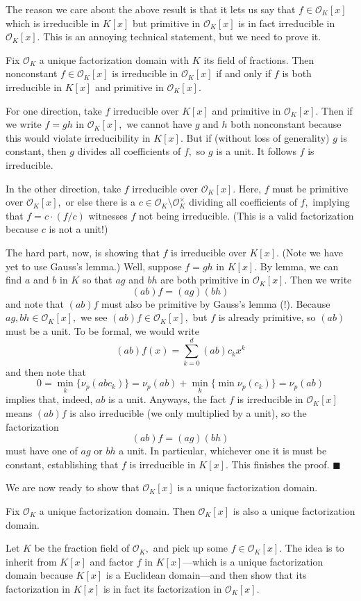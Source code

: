 The reason we care about the above result is that it lets us say that $f\in \mathcal O_K[x]$ which is irreducible in $K[x]$ but primitive in $\mathcal O_K[x]$ is in fact irreducible in $\mathcal O_K[x].$ This is an annoying technical statement, but we need to prove it.
\begin{lemma}
    Fix $\mathcal O_K$ a unique factorization domain with $K$ its field of fractions. Then nonconstant $f\in\mathcal O_K[x]$ is irreducible in $\mathcal O_K[x]$ if and only if $f$ is both irreducible in $K[x]$ and primitive in $\mathcal O_K[x].$
\end{lemma}
For one direction, take $f$ irreducible over $K[x]$ and primitive in $\mathcal O_K[x].$ Then if we write $f=gh$ in $\mathcal O_K[x],$ we cannot have $g$ and $h$ both nonconstant because this would violate irreducibility in $K[x].$ But if (without loss of generality) $g$ is constant, then $g$ divides all coefficients of $f,$ so $g$ is a unit. It follows $f$ is irreducible.

In the other direction, take $f$ irreducible over $\mathcal O_K[x].$ Here, $f$ must be primitive over $\mathcal O_K[x],$ or else there is a $c\in\mathcal O_K\setminus\mathcal O_K^\times$ dividing all coefficients of $f,$ implying that $f=c\cdot(f/c)$ witnesses $f$ not being irreducible. (This is a valid factorization because $c$ is not a unit!)

The hard part, now, is showing that $f$ is irreducible over $K[x].$ (Note we have yet to use Gauss's lemma.) Well, suppose $f=gh$ in $K[x].$ By lemma, we can find $a$ and $b$ in $K$ so that $ag$ and $bh$ are both primitive in $\mathcal O_K[x].$ Then we write
\[(ab)f=(ag)(bh)\]
and note that $(ab)f$ must also be primitive by Gauss's lemma (!). Because $ag,bh\in\mathcal O_K[x],$ we see $(ab)f\in\mathcal O_K[x],$ but $f$ is already primitive, so $(ab)$ must be a unit. To be formal, we would write
\[(ab)f(x)=\sum_{k=0}^d(ab)c_kx^k\]
and then note that
\[0=\min_k\{\nu_p(abc_k)\}=\nu_p(ab)+\min_k\{\min\nu_p(c_k)\}=\nu_p(ab)\]
implies that, indeed, $ab$ is a unit. Anyways, the fact $f$ is irreducible in $\mathcal O_K[x]$ means $(ab)f$ is also irreducible (we only multiplied by a unit), so the factorization
\[(ab)f=(ag)(bh)\]
must have one of $ag$ or $bh$ a unit. In particular, whichever one it is must be constant, establishing that $f$ is irreducible in $K[x].$ This finishes the proof. $\blacksquare$

We are now ready to show that $\mathcal O_K[x]$ is a unique factorization domain.
\begin{theorem}
    Fix $\mathcal O_K$ a unique factorization domain. Then $\mathcal O_K[x]$ is also a unique factorization domain.
\end{theorem}
Let $K$ be the fraction field of $\mathcal O_K,$ and pick up some $f\in\mathcal O_K[x].$ The idea is to inherit from $K[x]$ and factor $f$ in $K[x]$---which is a unique factorization domain because $K[x]$ is a Euclidean domain---and then show that its factorization in $K[x]$ is in fact its factorization in $\mathcal O_K[x].$

